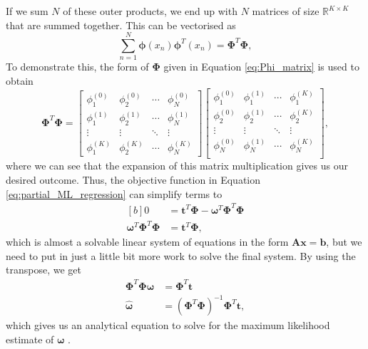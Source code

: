 \documentclass{article}
\begin{document}
If we sum $N$ of these outer products, we end up with $N$ matrices of size $\mathbb{R}^{K \times K}$ that are summed together. This can be vectorised as
\begin{equation}
\sum_{n=1}^N \boldsymbol\phi(x_n) \boldsymbol\phi^T(x_n) = \boldsymbol\Phi^T \boldsymbol\Phi,
\end{equation}
To demonstrate this, the form of $\boldsymbol\Phi$ given in Equation \eqref{eq:Phi_matrix} is used to obtain
\begin{equation}
\boldsymbol\Phi^T \boldsymbol\Phi = 
\begin{bmatrix}
\phi_1^{(0)} & \phi_2^{(0)} & \cdots & \phi_N^{(0)}  \\
\phi_1^{(1)} & \phi_2^{(1)} & \cdots & \phi_N^{(1)} \\
\vdots & \vdots & \ddots & \vdots \\
\phi_1^{(K)} & \phi_2^{(K)} & \cdots & \phi_N^{(K)}
\end{bmatrix}
\begin{bmatrix}
\phi_1^{(0)} & \phi_1^{(1)} & \cdots & \phi_1^{(K)} \\
\phi_2^{(0)} & \phi_2^{(1)} & \cdots & \phi_2^{(K)} \\
\vdots & \vdots & \ddots & \vdots \\
\phi_N^{(0)} & \phi_N^{(1)} & \cdots & \phi_N^{(K)} \\
\end{bmatrix},
\end{equation}
where we can see that the expansion of this matrix multiplication gives us our desired outcome. Thus, the objective function in Equation \eqref{eq:partial_ML_regression} can simplify terms to 
\begin{equation}
\begin{aligned}[b]
0 &= \mathbf{t}^T\boldsymbol\Phi  - \boldsymbol\omega^T \boldsymbol\Phi^T \boldsymbol\Phi \\
\boldsymbol\omega^T \boldsymbol\Phi^T \boldsymbol\Phi &= \mathbf{t}^T\boldsymbol\Phi,
\end{aligned}
\end{equation}
which is almost a solvable linear system of equations in the form $\mathbf{A}\mathbf{x} = \mathbf{b}$, but we need to put in just a little bit more work to solve the final system. By using the transpose, we get
\begin{equation}
\begin{aligned}
\boldsymbol\Phi^T \boldsymbol\Phi \boldsymbol\omega  &= \boldsymbol\Phi^T \mathbf{t} \\
\hat{\boldsymbol\omega}  &= \left( \boldsymbol\Phi^T \boldsymbol\Phi \right)^{-1} \boldsymbol\Phi^T \mathbf{t},
\end{aligned}
\end{equation}
which gives us an analytical equation to solve for the maximum likelihood estimate of $\boldsymbol\omega$ \cite{bishop2006}.
\end{document}

